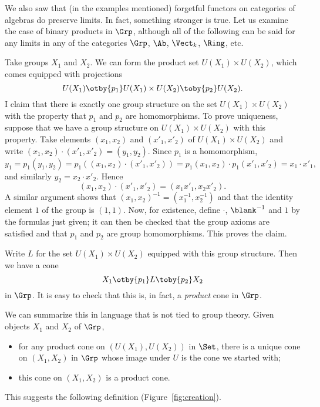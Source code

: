 \begin{example} 
\label{eg:gp-creation}
%
%
%
%
We also saw that (in the examples mentioned) forgetful functors on
categories of algebras do preserve limits.  In fact, something stronger is
true.  Let us examine the case of binary products in $\Grp$, although all
of the following can be said for any limits in any of the categories
$\Grp$, $\Ab$, $\Vect_k$, $\Ring$, etc.

Take groups $X_1$ and $X_2$.  We can form the product set $U(X_1) \times
U(X_2)$, which comes equipped with projections
\[
U(X_1) \otby{p_1} U(X_1) \times U(X_2) \toby{p_2} U(X_2).
\]
I claim that there is exactly one group structure on the set $U(X_1) \times
U(X_2)$ with the property that $p_1$ and $p_2$ are homomorphisms.  To prove
uniqueness, suppose that we have a group structure on $U(X_1) \times U(X_2)$
with this property.  Take elements $(x_1, x_2)$ and $(x'_1, x'_2)$ of
$U(X_1) \times U(X_2)$ and write $(x_1, x_2) \cdot (x'_1, x'_2) = (y_1,
y_2)$.  Since $p_1$ is a homomorphism,
\[
y_1
=
p_1(y_1, y_2)
=
p_1((x_1, x_2) \cdot (x'_1, x'_2))
=
p_1(x_1, x_2) \cdot p_1(x'_1, x'_2)
=
x_1 \cdot x'_1,
\]
and similarly $y_2 = x_2 \cdot x'_2$.  Hence 
\[
(x_1, x_2) \cdot (x'_1, x'_2) = (x_1 x'_1, x_2 x'_2).  
\]
A similar argument shows that $(x_1, x_2)^{-1} = (x_1^{-1}, x_2^{-1})$ and
that the identity element $1$ of the group is $(1, 1)$.  Now, for
existence, define $\cdot$, $\blank^{-1}$ and $1$ by the formulas just
given; it can then be checked that the group axioms are satisfied and that
$p_1$ and $p_2$ are group homomorphisms.  This proves the claim.

Write $L$ for the set $U(X_1) \times U(X_2)$ equipped with this group
structure.  Then we have a cone
\[
X_1 \otby{p_1} L \toby{p_2} X_2
\]
in $\Grp$.  It is easy to check that this is, in fact, a \emph{product}
cone in $\Grp$.

We can summarize this in language that is not tied to group theory.  Given
objects $X_1$ and $X_2$ of $\Grp$,
% 
\begin{itemize}
\item 
for any product cone on $(U(X_1), U(X_2))$ in $\Set$, there is a unique
cone on $(X_1, X_2)$ in $\Grp$ whose image under $U$ is the cone we started
with; 

\item 
this cone on $(X_1, X_2)$ is a product cone.
\end{itemize}
\end{example}
% 
This suggests the following definition (Figure~\ref{fig:creation}).


